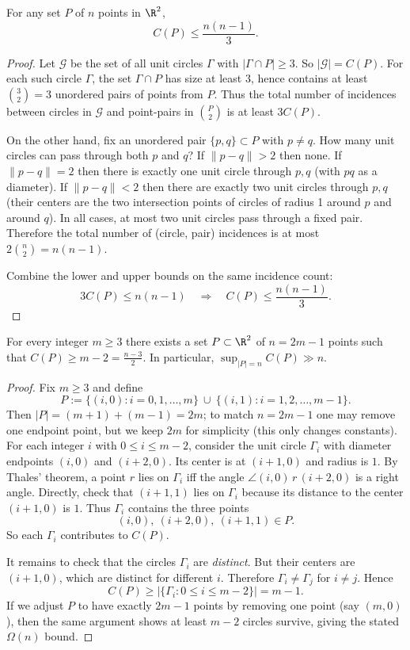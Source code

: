 \begin{lemma}
For any set $P$ of $n$ points in $\R^2$,
\[C(P)\le \frac{n(n-1)}{3}.
\]
\end{lemma}

\begin{proof}
Let $\mathcal{G}$ be the set of all unit circles $\Gamma$ with $|\Gamma\cap P|\ge 3$.
So $|\mathcal{G}|=C(P)$.
For each such circle $\Gamma$, the set $\Gamma\cap P$ has size at least $3$, hence contains at least $\binom{3}{2}=3$ unordered pairs of points from $P$.
Thus the total number of incidences between circles in $\mathcal{G}$ and point-pairs in $\binom{P}{2}$ is at least $3C(P)$.

On the other hand, fix an unordered pair $\{p,q\}\subset P$ with $p\ne q$.
How many unit circles can pass through both $p$ and $q$?
If $\|p-q\|>2$ then none.
If $\|p-q\|=2$ then there is exactly one unit circle through $p,q$ (with $pq$ as a diameter).
If $\|p-q\|<2$ then there are exactly two unit circles through $p,q$ (their centers are the two intersection points of circles of radius 1 around $p$ and around $q$).
In all cases, at most two unit circles pass through a fixed pair.
Therefore the total number of (circle, pair) incidences is at most $2\binom{n}{2}=n(n-1)$.

Combine the lower and upper bounds on the same incidence count:
\[3C(P)\le n(n-1)\quad\Rightarrow\quad C(P)\le \frac{n(n-1)}{3}.
\]
\end{proof}

\begin{proposition}
For every integer $m\ge 3$ there exists a set $P\subset\R^2$ of $n=2m-1$ points such that $C(P)\ge m-2=\frac{n-3}{2}$.
In particular, $\sup_{|P|=n}C(P)\gg n$.
\end{proposition}

\begin{proof}
Fix $m\ge 3$ and define
\[P:=\{(i,0): i=0,1,\dots,m\}\ \cup\ \{(i,1): i=1,2,\dots,m-1\}.
\]
Then $|P|=(m+1)+(m-1)=2m$; to match $n=2m-1$ one may remove one endpoint point, but we keep $2m$ for simplicity (this only changes constants).
For each integer $i$ with $0\le i\le m-2$, consider the unit circle $\Gamma_i$ with diameter endpoints $(i,0)$ and $(i+2,0)$.
Its center is at $(i+1,0)$ and radius is $1$.
By Thales' theorem, a point $r$ lies on $\Gamma_i$ iff the angle $\angle (i,0)\,r\,(i+2,0)$ is a right angle.
Directly, check that $(i+1,1)$ lies on $\Gamma_i$ because its distance to the center $(i+1,0)$ is $1$.
Thus $\Gamma_i$ contains the three points
\[(i,0),\ (i+2,0),\ (i+1,1)\in P.
\]
So each $\Gamma_i$ contributes to $C(P)$.

It remains to check that the circles $\Gamma_i$ are \emph{distinct}.
But their centers are $(i+1,0)$, which are distinct for different $i$.
Therefore $\Gamma_i\ne \Gamma_j$ for $i\ne j$.
Hence
\[C(P)\ge |\{\Gamma_i:0\le i\le m-2\}|=m-1.
\]
If we adjust $P$ to have exactly $2m-1$ points by removing one point (say $(m,0)$), then the same argument shows at least $m-2$ circles survive, giving the stated $\Omega(n)$ bound.
\end{proof}

